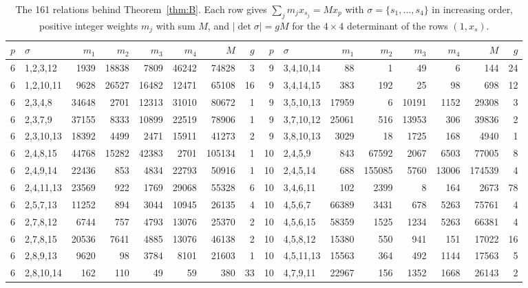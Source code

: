 \begin{table}[tp]
\scriptsize
\caption{The 161 relations behind Theorem~\ref{thm:B}. Each row gives $\sum_j m_j x_{s_j}=M x_p$ with $\sigma=\{s_1,\dots,s_4\}$ in increasing order, positive integer weights $m_j$ with sum $M$, and $|\det\sigma|=gM$ for the $4\times4$ determinant of the rows $(1,x_s)$.}\label{tab:certB}
\begin{ruledtabular}
\begin{tabular}{rlrrrrrr@{\hspace{2.2em}}rlrrrrrr}
$p$ & $\sigma$ & $m_1$ & $m_2$ & $m_3$ & $m_4$ & $M$ & $g$ & $p$ & $\sigma$ & $m_1$ & $m_2$ & $m_3$ & $m_4$ & $M$ & $g$ \\ \hline
6 & 1,2,3,12 & 1939 & 18838 & 7809 & 46242 & 74828 & 3 & 9 & 3,4,10,14 & 88 & 1 & 49 & 6 & 144 & 24 \\
6 & 1,2,10,11 & 9628 & 26527 & 16482 & 12471 & 65108 & 16 & 9 & 3,4,14,15 & 383 & 192 & 25 & 98 & 698 & 12 \\
6 & 2,3,4,8 & 34648 & 2701 & 12313 & 31010 & 80672 & 1 & 9 & 3,5,10,13 & 17959 & 6 & 10191 & 1152 & 29308 & 3 \\
6 & 2,3,7,9 & 37155 & 8333 & 10899 & 22519 & 78906 & 1 & 9 & 3,7,10,12 & 25061 & 516 & 13953 & 306 & 39836 & 2 \\
6 & 2,3,10,13 & 18392 & 4499 & 2471 & 15911 & 41273 & 2 & 9 & 3,8,10,13 & 3029 & 18 & 1725 & 168 & 4940 & 1 \\
6 & 2,4,8,15 & 44768 & 15282 & 42383 & 2701 & 105134 & 1 & 10 & 2,4,5,9 & 843 & 67592 & 2067 & 6503 & 77005 & 8 \\
6 & 2,4,9,14 & 22436 & 853 & 4834 & 22793 & 50916 & 1 & 10 & 2,4,5,14 & 688 & 155085 & 5760 & 13006 & 174539 & 4 \\
6 & 2,4,11,13 & 23569 & 922 & 1769 & 29068 & 55328 & 6 & 10 & 3,4,6,11 & 102 & 2399 & 8 & 164 & 2673 & 78 \\
6 & 2,5,7,13 & 11252 & 894 & 3044 & 10945 & 26135 & 4 & 10 & 4,5,6,7 & 66389 & 3431 & 678 & 5263 & 75761 & 4 \\
6 & 2,7,8,12 & 6744 & 757 & 4793 & 13076 & 25370 & 2 & 10 & 4,5,6,15 & 58359 & 1525 & 1234 & 5263 & 66381 & 4 \\
6 & 2,7,8,15 & 20536 & 7641 & 4885 & 13076 & 46138 & 2 & 10 & 4,5,8,12 & 15380 & 550 & 941 & 151 & 17022 & 16 \\
6 & 2,8,9,13 & 9620 & 98 & 3784 & 8101 & 21603 & 1 & 10 & 4,5,11,13 & 15563 & 364 & 492 & 1144 & 17563 & 5 \\
6 & 2,8,10,14 & 162 & 110 & 49 & 59 & 380 & 33 & 10 & 4,7,9,11 & 22967 & 156 & 1352 & 1668 & 26143 & 2 \\

\end{tabular}
\end{ruledtabular}
\end{table}
